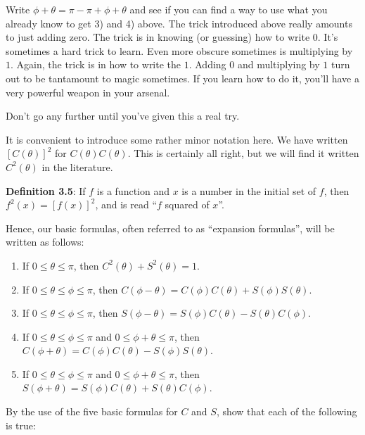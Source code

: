 \documentclass[english]{book}
\begin{document}
Write $\phi + \theta = \pi - \pi + \phi + \theta$ and see if you can find a way to use what you already know to get 3) and 4) above. The trick introduced above really amounts to just adding zero. The trick is in knowing (or guessing) how to write $0$. It's sometimes a hard trick to learn. Even more obscure sometimes is multiplying by $1$. Again, the trick is in how to write the $1$. Adding $0$ and multiplying by $1$ turn out to be tantamount to magic sometimes. If you learn how to do it, you'll have a very powerful weapon in your arsenal.

Don't go any further until you've given this a real try.

\vspace{0.3cm}

It is convenient to introduce some rather minor notation here. We have written $[C(\theta)]^{2}$ for $C(\theta) C(\theta)$. This is certainly all right, but we will find it written $C^{2}(\theta)$ in the literature.

\vspace{0.3cm}

\textbf{Definition 3.5}: If $f$ is a function and $x$ is a number in the initial set of $f$, then $f^{2}(x) = [f(x)]^{2}$, and is read ``$f$ squared of $x$''.

\vspace{0.3cm}

Hence, our basic formulas, often referred to as ``expansion formulas'', will be written as follows:
\begin{enumerate}[\hspace{1cm}1)]
  \item If $0 \leq \theta \leq \pi$, then $C^{2}(\theta) + S^{2}(\theta) = 1$. 
  \item If $0 \leq \theta \leq \phi \leq \pi$, then $C(\phi-\theta) = C(\phi) C(\theta) + S(\phi) S(\theta)$.
  \item If $0 \leq \theta \leq \phi \leq \pi$, then $S(\phi-\theta) = S(\phi) C(\theta) - S(\theta) C(\phi)$.
  \item If $0 \leq \theta \leq \phi \leq \pi$ and $0 \leq \phi + \theta \leq \pi$, then $C(\phi+\theta) = C(\phi) C(\theta) - S(\phi) S(\theta)$.
  \item If $0 \leq \theta \leq \phi \leq \pi$ and $0 \leq \phi + \theta \leq \pi$, then $S(\phi+\theta) = S(\phi) C(\theta) + S(\theta) C(\phi)$.
\end{enumerate}

By the use of the five basic formulas for $C$ and $S$, show that each of the following is true:
\end{document}
